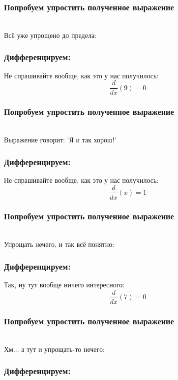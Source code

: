 \documentclass[a4paper,12pt]{article}
\begin{document}
\subsubsection*{Попробуем упростить полученное выражение}
\\Всё уже упрощено до предела:

\subsubsection*{Дифференцируем:}

Не спрашивайте вообще, как это у нас получилось:
\begin{dmath}\frac{d}{dx}\left(9\right)=0\end{dmath}
\subsubsection*{Попробуем упростить полученное выражение}
\\Выражение говорит: 'Я и так хорош!'

\subsubsection*{Дифференцируем:}

Не спрашивайте вообще, как это у нас получилось:
\begin{dmath}\frac{d}{dx}\left(x\right)=1\end{dmath}
\subsubsection*{Попробуем упростить полученное выражение}
\\Упрощать нечего, и так всё понятно:

\subsubsection*{Дифференцируем:}

Так, ну тут вообще ничего интересного:
\begin{dmath}\frac{d}{dx}\left(7\right)=0\end{dmath}
\subsubsection*{Попробуем упростить полученное выражение}
\\Хм... а тут и упрощать-то нечего:

\subsubsection*{Дифференцируем:}
\end{document}
